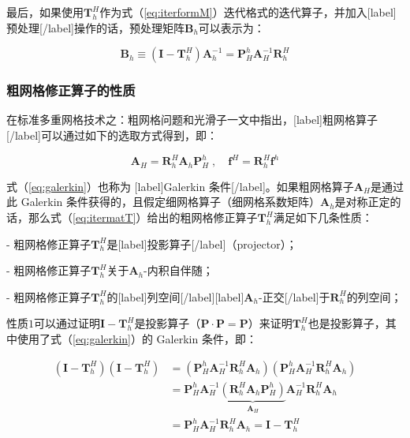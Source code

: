 \documentclass[12pt, UTF8, nofonts]{ctexart}
\begin{document}
最后，如果使用$\boldsymbol{T}_h^{H}$作为式（\ref{eq:iterformM}）迭代格式的迭代算子，并加入[label]预处理[/label]操作的话，预处理矩阵$\boldsymbol{B}_h$可以表示为：

\[
  \boldsymbol{B}_h \equiv (\boldsymbol{I}-\boldsymbol{T}_{h}^{H})\boldsymbol{A}_h^{-1} =
  \boldsymbol{P}_{H}^{h}\boldsymbol{A}_{H}^{-1}\boldsymbol{R}_{h}^{H}
\]

\subsubsection*{粗网格修正算子的性质}

在标准多重网格技术之：粗网格问题和光滑子一文中指出，[label]粗网格算子[/label]可以通过如下的选取方式得到，即：

\begin{equation}
  \label{eq:galerkin}
  \boldsymbol{A}_{H} = \boldsymbol{R}_{h}^{H} \boldsymbol{A}_h \boldsymbol{P}_{H}^{h} \;,\quad
  \boldsymbol{f}^{H} = \boldsymbol{R}_{h}^{H}\boldsymbol{f}^h
\end{equation}

式（\ref{eq:galerkin}）也称为 [label]Galerkin 条件[/label]。如果粗网格算子$\boldsymbol{A}_H$是通过此 Galerkin 条件获得的，且假定细网格算子（细网格系数矩阵）$\boldsymbol{A}_h$是对称正定的话，那么式（\ref{eq:itermatT}）给出的粗网格修正算子$\boldsymbol{T}_{h}^{H}$满足如下几条性质：

- 粗网格修正算子$\boldsymbol{T}_{h}^{H}$是[label]投影算子[/label]（projector）；

- 粗网格修正算子$\boldsymbol{T}_h^H$关于$\boldsymbol{A}_h$-内积自伴随；

- 粗网格修正算子$\boldsymbol{T}_h^H$的[label]列空间[/label][label]$\boldsymbol{A}_h$-正交[/label]于$\boldsymbol{R}_h^H$的列空间；

性质$1$可以通过证明$\boldsymbol{I}-\boldsymbol{T}_{h}^{H}$是投影算子（$\boldsymbol{P}\cdot\boldsymbol{P}=\boldsymbol{P}$）来证明$\boldsymbol{T}_{h}^{H}$也是投影算子，其中使用了式（\ref{eq:galerkin}）的 Galerkin 条件，即：

\[
  \begin{aligned}
    (\boldsymbol{I}-\boldsymbol{T}_h^H)(\boldsymbol{I}-\boldsymbol{T}_h^H) &=
    (\boldsymbol{P}_H^h\boldsymbol{A}_{H}^{-1}\boldsymbol{R}_h^H\boldsymbol{A}_h)(\boldsymbol{P}_H^h\boldsymbol{A}_{H}^{-1}\boldsymbol{R}_h^H\boldsymbol{A}_h) \\
    &= \boldsymbol{P}_H^h\boldsymbol{A}_{H}^{-1}\underbrace{(\boldsymbol{R}_h^H\boldsymbol{A}_h\boldsymbol{P}_H^h)}_{\boldsymbol{A}_H}\boldsymbol{A}_{H}^{-1}\boldsymbol{R}_h^H\boldsymbol{A}_h \\
    &= \boldsymbol{P}_H^h\boldsymbol{A}_H^{-1}\boldsymbol{R}_{h}^{H}\boldsymbol{A}_h = \boldsymbol{I} - \boldsymbol{T}_h^H
  \end{aligned}
\]
\end{document}
